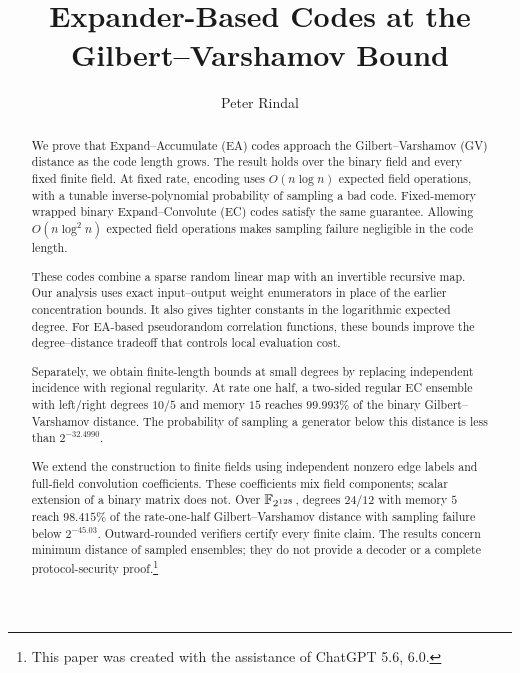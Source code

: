 \documentclass[11pt]{article}
\title{Expander-Based Codes at the Gilbert--Varshamov Bound}
\author{Peter Rindal}
\date{}
\begin{document}
\maketitle

\begin{abstract}
We prove that Expand--Accumulate (EA) codes approach the Gilbert--Varshamov
(GV) distance as the code length grows.  The result holds over the binary
field and every fixed finite field.  At fixed rate, encoding uses
$O(n\log n)$ expected field operations, with a tunable inverse-polynomial
probability of sampling a bad code.
Fixed-memory wrapped binary Expand--Convolute (EC) codes satisfy the same
guarantee.  Allowing $O(n\log^2 n)$ expected field operations makes sampling
failure negligible in the code length.

These codes combine a sparse random linear map with an invertible recursive
map.  Our analysis uses exact input--output weight enumerators in place of
the earlier concentration bounds.  It also gives tighter constants in the
logarithmic expected degree.  For EA-based pseudorandom correlation
functions, these bounds improve the degree--distance tradeoff that controls
local evaluation cost.

Separately, we obtain finite-length bounds at small degrees by replacing
independent incidence with regional regularity.  At rate one half, a
two-sided regular EC ensemble with left/right degrees $10/5$ and memory $15$
reaches $99.993\%$ of the binary Gilbert--Varshamov distance.  The probability
of sampling a generator below this distance is less than $2^{-32.4990}$.

We extend the construction to finite fields using independent nonzero edge
labels and full-field convolution coefficients.  These coefficients mix
field components; scalar extension of a binary matrix does not.  Over
$\mathbb F_{2^{128}}$, degrees $24/12$ with memory $5$ reach $98.415\%$ of the
rate-one-half Gilbert--Varshamov distance with sampling failure below
$2^{-45.03}$.  Outward-rounded verifiers certify every finite claim.  The
results concern minimum distance of sampled ensembles; they do not provide a
decoder or a complete protocol-security proof.\footnote{This paper was created
with the assistance of ChatGPT 5.6, 6.0.}
\end{abstract}











\appendix







\end{document}
